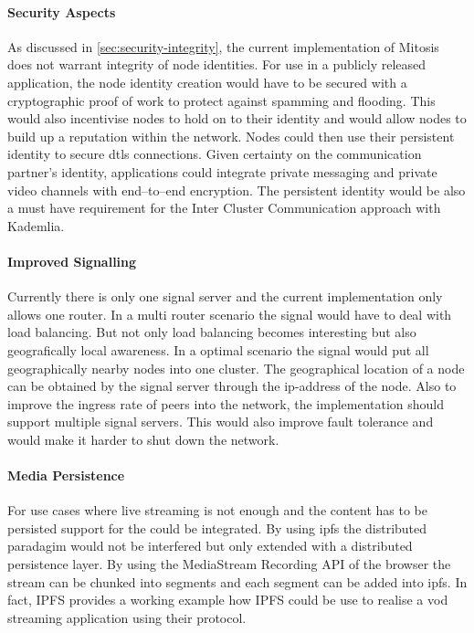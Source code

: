\paragraph{Security Aspects}
As discussed in \vref{sec:security-integrity}, the current implementation of Mitosis does not warrant integrity of node identities. For use in a publicly released application, the node identity creation would have to be secured with a cryptographic proof of work to protect against spamming and flooding. This would also incentivise nodes to hold on to their identity and would allow nodes to build up a reputation within the network. Nodes could then use their persistent identity to secure \gls{dtls} connections. Given certainty on the communication partner's identity, applications could integrate private messaging and private video channels with end–to–end encryption. The persistent identity would be also a must have requirement for the Inter Cluster Communication approach with Kademlia.

\paragraph{Improved Signalling}
Currently there is only one signal server and the current implementation only allows one router. In a multi router scenario the signal would have to deal with load balancing. But not only load balancing becomes interesting but also geografically local awareness. In a optimal scenario the signal would put all geographically nearby nodes into one cluster. The geographical location of a node can be obtained by the signal server through the ip-address of the node.
Also to improve the ingress rate of peers into the network, the implementation should support multiple signal servers. This would also improve fault tolerance and would make it harder to shut down the network.

\paragraph{Media Persistence}
For use cases where live streaming is not enough and the content has to be persisted support for the  could be integrated. By using \gls{ipfs} the distributed paradagim would not be interfered but only extended with a distributed persistence layer. 
By using the MediaStream Recording API of the browser \cite{media-recorder-api} the stream can be chunked into segments and each segment can be added into \gls{ipfs}. In fact, IPFS provides a working example how IPFS could be use to realise a \gls{vod} streaming application using their protocol.